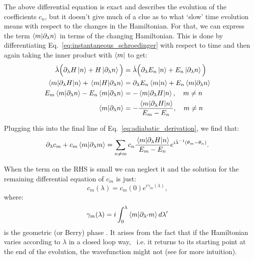     The above differential equation is exact and describes the evolution of the coefficients $c_n$,  but it doesn't give much of a clue as to what `slow' time evolution means with respect to the changes in the Hamiltonian. For that, we can express the term $\braket{m}{\partial_{\lambda} n}$ in terms of the changing Hamiltonian. This is done by differentiating Eq.~\eqref{eq:instantaneous_schroedinger} with respect to time and then again taking the inner product with $\bra{m}$ to get:
    \begin{equation}\label{eq:hamiltonian_derivative}
        \begin{aligned}
            \dot{\lambda} \Big(\partial_{\lambda}{H}\ket{n} + H \ket{\partial_{\lambda} n}\Big)  &= \dot{\lambda} \Big(\partial_{\lambda}{E_n}\ket{n} + E_n \ket{\partial_{\lambda} n}\Big) \\
            \mel{m}{\partial_{\lambda}H}{n} + \mel{m}{H}{\partial_{\lambda}n} &= \partial_{\lambda} E_n\braket{m}{n} + E_n \braket{m}{\partial_{\lambda} n} \\
            E_m \braket{m}{\partial_{\lambda} n} - E_n \braket{m}{\partial_{\lambda} n} &= - \mel{m}{\partial_{\lambda}H}{n}, \quad m \neq n \\
            \braket{m}{\partial_{\lambda} n} &= - \frac{\mel{m}{\partial_{\lambda}H}{n}}{E_m - E_n}, \quad m \neq n
        \end{aligned}
    \end{equation}
    
    Plugging this into the final line of Eq.~\eqref{eq:adiabatic_derivation}, we find that:
    \begin{equation}\label{eq:coefficient_exact}
            \partial_{\lambda} c_m + c_m \braket{m}{\partial_{\lambda} m} = \sum_{n \neq m} c_n  \frac{\mel{m}{\partial_{\lambda}H}{n}}{E_m - E_n}e^{i \dot{\lambda}^{-1} (\theta_m-\theta_n)}.
    \end{equation}
    
    When the term on the RHS is small we can neglect it and the solution for the remaining differential equation of $c_m$ is just:
    \begin{equation}\label{eq:c_adiabatic}
        c_m(\lambda) = c_m(0)e^{i \gamma_m(\lambda)},
    \end{equation}
    where:
    \begin{equation}\label{eq:geometric_phase}
        \gamma_m(\lambda) = i \int_0^{\lambda} \braket{m}{\partial_{\lambda'} m} d \lambda' 
    \end{equation}
    is the geometric (or Berry) phase \cite{pancharatnam_generalized_1956, longuet-higgins_studies_1958, berry_quantal_1984}. It arises from the fact that if the Hamiltonian varies according to $\lambda$ in a closed loop way, \@~i.e. it returns to its starting point at the end of the evolution, the wavefunction might not (see  for more intuition). 
    
